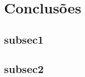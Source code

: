 \chapter{Conclusões} \label{chap:conclusions}
	\begin{myenv}{1.5}
		
		\section{subsec1}
		\section{subsec2}
		
	\end{myenv}